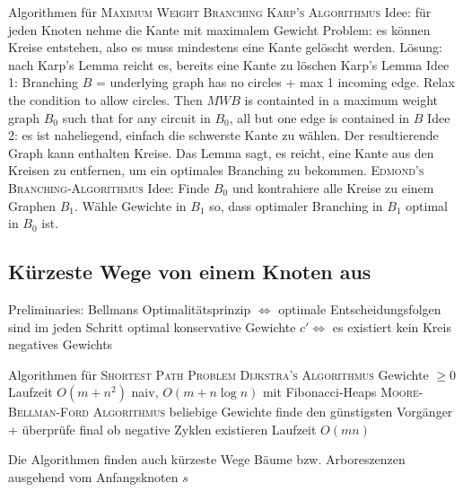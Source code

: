 \begin{outline}
    \1 Algorithmen für \textsc{Maximum Weight Branching}
        \2 \textsc{Karp's Algorithmus} 
            \3 Idee: für jeden Knoten nehme die Kante mit maximalem Gewicht
            \3 Problem: es können Kreise entstehen, also es muss mindestens eine Kante gelöscht werden.
            \3 Lösung: nach Karp's Lemma reicht es, bereits eine Kante zu löschen
        \2 Karp's Lemma
            \3 Idee 1: Branching $B$ = underlying graph has no circles + max 1 incoming edge. Relax the condition to allow circles. Then $MWB$ is containted in a maximum weight graph $B_0$ such that for any circuit in $B_0$, all but one edge is contained in $B$
            \3 Idee 2: es ist naheliegend, einfach die schwerste Kante zu wählen. Der resultierende Graph kann enthalten Kreise. Das Lemma sagt, es reicht, eine Kante aus den Kreisen zu entfernen, um ein optimales Branching zu bekommen.
        \2 \textsc{Edmond's Branching-Algorithmus}
            \3 Idee: Finde $B_0$ und kontrahiere alle Kreise zu einem Graphen $B_1$. Wähle Gewichte in $B_1$ so, dass optimaler Branching in $B_1$ optimal in $B_0$ ist.
\end{outline}

\subsection{Kürzeste Wege von einem Knoten aus}
\begin{outline}
    \1 Preliminaries:
        \2 Bellmans Optimalitätsprinzip $\iff$ optimale Entscheidungsfolgen sind im jeden Schritt optimal
        \2 konservative Gewichte $c' \iff$ es existiert kein Kreis negatives Gewichts


    \1 Algorithmen für \textsc{Shortest Path Problem}
        \2 \textsc{Dijkstra's Algorithmus}
            \3 Gewichte $\geq 0$
            \3 Laufzeit $O(m+n^2)$ naiv, $O(m+n\log n)$ mit Fibonacci-Heaps
        \2 \textsc{Moore-Bellman-Ford Algorithmus}
            \3 beliebige Gewichte
            \3 finde den günstigsten Vorgänger + überprüfe final ob negative Zyklen existieren
            \3 Laufzeit $O(mn)$
    
    \1 Die Algorithmen finden auch kürzeste Wege Bäume bzw. Arboreszenzen ausgehend vom Anfangsknoten $s$
\end{outline}

